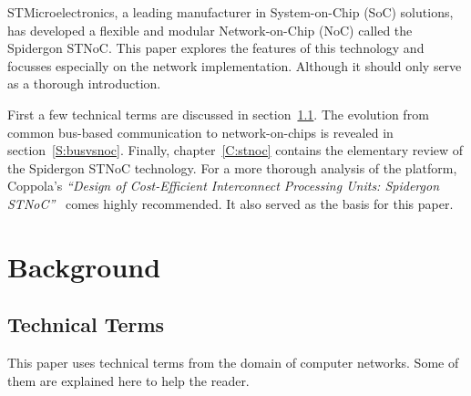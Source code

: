 STMicroelectronics, a leading manufacturer in System-on-Chip (SoC) solutions, has developed a flexible and modular Network-on-Chip (NoC) called the Spidergon STNoC. 
This paper explores the features of this technology and focusses especially on the network implementation. Although it should only serve as a thorough introduction. 

First a few technical terms are discussed in section~\ref{S:terms}. The evolution from common bus-based communication to network-on-chips is revealed in section~\ref{S:busvsnoc}. 
Finally, chapter~\ref{C:stnoc} contains the elementary review of the Spidergon STNoC technology. For a more thorough analysis of the platform, Coppola's \emph{``Design of Cost-Efficient Interconnect Processing Units: Spidergon STNoC''}~\cite{coppola2008design} comes highly recommended. It also served as the basis for this paper.

\section{Background}\label{C:background}

\subsection{Technical Terms}\label{S:terms}
	
This paper uses technical terms from the domain of computer networks. 
Some of them are explained here to help the reader.

